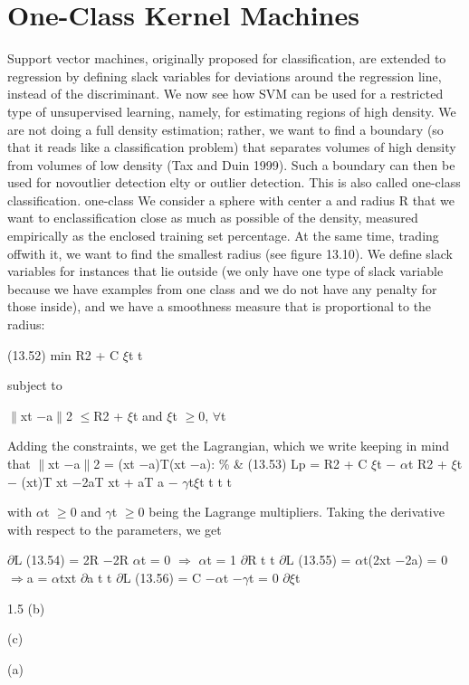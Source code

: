\section{One-Class Kernel Machines}

Support vector machines, originally proposed for classification, are extended to regression by defining slack variables for deviations around the regression line, instead of the discriminant. We now see how SVM can be used for a restricted type of unsupervised learning, namely, for estimating regions of high density. We are not doing a full density estimation; rather, we want to find a boundary (so that it reads like a classification problem) that separates volumes of high density from volumes of low density (Tax and Duin 1999). Such a boundary can then be used for novoutlier detection elty or outlier detection. This is also called one-class classification. one-class We consider a sphere with center a and radius R that we want to enclassification close as much as possible of the density, measured empirically as the enclosed training set percentage. At the same time, trading offwith it, we want to find the smallest radius (see figure 13.10). We define slack variables for instances that lie outside (we only have one type of slack variable because we have examples from one class and we do not have any penalty for those inside), and we have a smoothness measure that is proportional to the radius:

(13.52) min R2 + C $\xi$t t

subject to

$\parallel$xt $-$a$\parallel$2 $\leq$R2 + $\xi$t and $\xi$t $\geq$0, $\forall$t

Adding the constraints, we get the Lagrangian, which we write keeping in mind that $\parallel$xt $-$a$\parallel$2 = (xt $-$a)T(xt $-$a): \% \& (13.53) Lp = R2 + C $\xi$t $-$ $\alpha$t R2 + $\xi$t $-$ (xt)T xt $-$2aT xt + aT a $-$ $\gamma$t$\xi$t t t t

with $\alpha$t $\geq$0 and $\gamma$t $\geq$0 being the Lagrange multipliers. Taking the derivative with respect to the parameters, we get

$\partial$L (13.54) = 2R $-$2R $\alpha$t = 0 $\Rightarrow$ $\alpha$t = 1 $\partial$R t t $\partial$L (13.55) = $\alpha$t(2xt $-$2a) = 0 $\Rightarrow$a = $\alpha$txt $\partial$a t t $\partial$L (13.56) = C $-$$\alpha$t $-$$\gamma$t = 0 $\partial$$\xi$t

1.5 (b)

(c)

(a)

